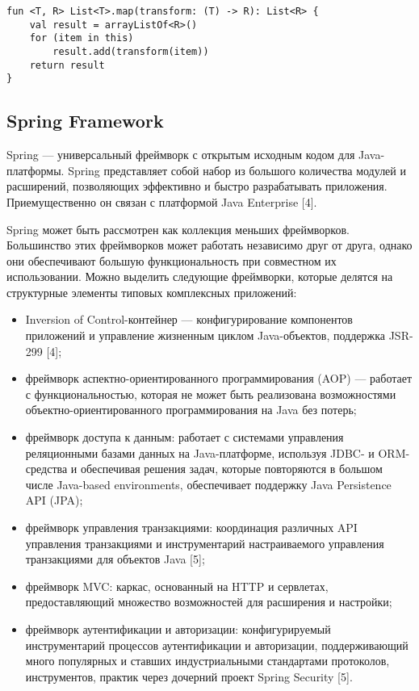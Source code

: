\begin{lstlisting}[style = ktstyle, 
           caption = {Реализация популярной функции высшего порядка <<map>> на языке \kt{}},
           label = {lst:kt_map}]
fun <T, R> List<T>.map(transform: (T) -> R): List<R> {
    val result = arrayListOf<R>()
    for (item in this)
        result.add(transform(item))
    return result
}
\end{lstlisting}

\subsection{Spring Framework}
\label{sec:spring}

Spring --- универсальный фреймворк с открытым исходным кодом для Java-платформы. 
Spring представляет собой набор из большого количества модулей и расширений, позволяющих
эффективно и быстро разрабатывать приложения. Приемущественно он связан с платформой 
Java Enterprise [4].

Spring может быть рассмотрен как коллекция меньших фреймворков. Большинство этих фреймворков 
может работать независимо друг от друга, однако они обеспечивают большую функциональность при 
совместном их использовании. Можно выделить следующие фреймворки, которые делятся на структурные 
элементы типовых комплексных приложений: 
\begin{itemize}
  \item Inversion of Control-контейнер --- конфигурирование компонентов приложений и управление 
  жизненным циклом Java-объектов, поддержка JSR-299 [4];
  \item фреймворк аспектно-ориентированного программирования (AOP) --- работает с функциональностью, 
  которая не может быть реализована возможностями объектно-ориентированного программирования на 
  Java без потерь;
  \item фреймворк доступа к данным: работает с системами управления реляционными базами данных на 
  Java-платформе, используя JDBC- и ORM-средства и обеспечивая решения задач, которые повторяются 
  в большом числе Java-based environments, обеспечивает поддержку Java Persistence API (JPA);
  \item фреймворк управления транзакциями: координация различных API управления транзакциями и 
  инструментарий настраиваемого управления транзакциями для объектов Java [5];
  \item фреймворк MVC: каркас, основанный на HTTP и сервлетах, предоставляющий множество 
  возможностей для расширения и настройки;
  \item фреймворк аутентификации и авторизации: конфигурируемый инструментарий процессов аутентификации и 
  авторизации, поддерживающий много популярных и ставших индустриальными стандартами протоколов, 
  инструментов, практик через дочерний проект Spring Security [5].
\end{itemize}

